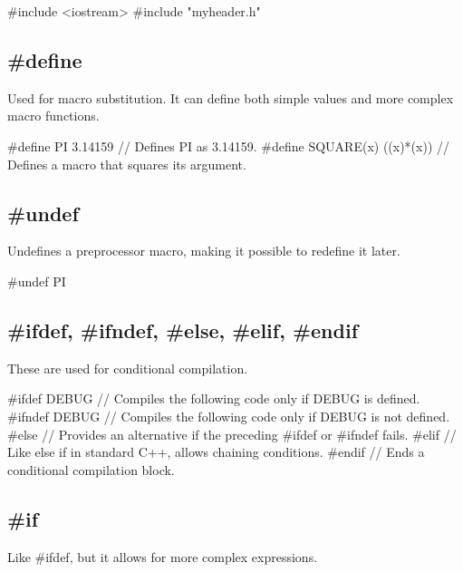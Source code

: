 \documentclass{report}
\begin{document}
    \begin{cppcode}
#include <iostream>
#include "myheader.h"
    \end{cppcode}
    

    \bigbreak \noindent 
    \subsection{\#define}
    \bigbreak \noindent 
    Used for macro substitution. It can define both simple values and more complex macro functions.
    \bigbreak \noindent 
    
    \begin{cppcode}
#define PI 3.14159 // Defines PI as 3.14159.
#define SQUARE(x) ((x)*(x)) // Defines a macro that squares its argument.
    \end{cppcode}
    

    \bigbreak \noindent 
    \subsection{\#undef}
    \bigbreak \noindent 
    Undefines a preprocessor macro, making it possible to redefine it later.
    \bigbreak \noindent 
    
    \begin{cppcode}
#undef PI
    \end{cppcode}
    

    \bigbreak \noindent 
    \subsection{\#ifdef, \#ifndef, \#else, \#elif, \#endif}
    \bigbreak \noindent 
    These are used for conditional compilation.
    \bigbreak \noindent 
    
    \begin{cppcode}
#ifdef DEBUG // Compiles the following code only if DEBUG is defined.
#ifndef DEBUG // Compiles the following code only if DEBUG is not defined.
#else // Provides an alternative if the preceding #ifdef or #ifndef fails.
#elif // Like else if in standard C++, allows chaining conditions.
#endif // Ends a conditional compilation block.
    \end{cppcode}
    

    \bigbreak \noindent 
    \subsection{\#if}
    \bigbreak \noindent 
    Like \#ifdef, but it allows for more complex expressions.
    \bigbreak \noindent 
    
\end{document}
